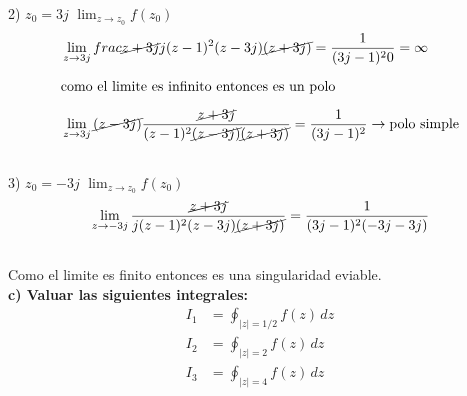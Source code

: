 \documentclass[12pt]{report}
\begin{document}
2) $z_0=3j$ \hspace{3cm} $\lim_{z \to z_0}f(z_0)$\\[10pt]

\begin{align*}
&\lim_{z \to 3j}frac{\cancel{z+3j}}{j(z - 1)^2(z-3j)\cancel{(z+3j)}}=\frac{1}{(3j-1)^20}=\infty\\[6pt]
&\text{como el limite es infinito entonces es un polo}\\[6pt]
&\lim_{z \to 3j}\cancel{(z - 3j)}\frac{\cancel{z+3j}}{(z - 1)^2\cancel{(z-3j)}\cancel{(z+3j)}}=\frac{1}{(3j-1)^2}\rightarrow \text{polo simple}\\[12pt]
\end{align*}


3) $z_0=-3j$ \hspace{3cm} $\lim_{z \to z_0}f(z_0)$\\[10pt]

\begin{align*}
&\lim_{z \to -3j}\frac{\cancel{z+3j}}{j(z - 1)^2(z-3j)\cancel{(z+3j)}}=\frac{1}{(3j-1)^2(-3j-3j)}\\[12pt]
\end{align*}

Como el limite es finito entonces es una singularidad eviable.\\

\textbf{c) Valuar las siguientes integrales:}\\[6pt]
\begin{align*}
    I_1 &= \oint_{|z|=1/2} f(z) \, dz \\[6pt]
    I_2 &= \oint_{|z|=2} f(z) \, dz \\[6pt]
    I_3 &= \oint_{|z|=4} f(z) \, dz\\[6pt]
\end{align*}
\end{document}
